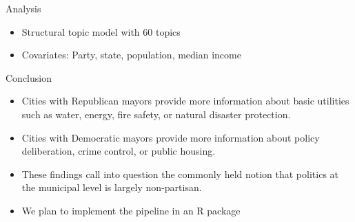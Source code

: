 \documentclass{beamer}
\begin{document}
\begin{frame}[fragile]
\begin{columns}[T]

\begin{column}{.6\textwidth}










\begin{block}{Analysis}

\begin{center}
\begin{itemize}
\item Structural topic model with 60 topics
\item Covariates: Party, state, population, median income
\end{itemize}

\vspace{5mm}




\end{center}

\end{block}

\begin{block}{Conclusion}
\begin{itemize}
\item Cities with Republican mayors provide more information about basic utilities such as water, energy, fire safety, or  natural disaster protection.
\item Cities with Democratic mayors provide more information about policy deliberation, crime control, or public housing.
\item These findings call into question the commonly held notion that politics at the municipal level is largely non-partisan.
\item We plan to implement the pipeline in an R package
\end{itemize}
\end{block}

\end{column}

\end{columns}



\end{frame}
\end{document}
